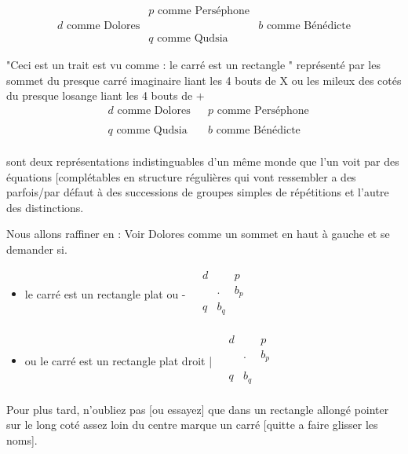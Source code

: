 \documentclass{article}
\begin{document}
$$\begin{matrix}
& p \text{ comme Perséphone}&\\
d \text{ comme Dolores}&&b\text{ comme Bénédicte}\\
&q\text{ comme Qudsia}&
\end{matrix}$$

  "Ceci est un trait est vu comme : le carré est un rectangle " représenté par les sommet du presque carré imaginaire liant les 4 bouts de X ou les mileux des cotés du presque losange liant les 4 bouts de  +
 $$\begin{matrix}
& d\text{ comme Dolores}&&p\text{ comme Perséphone}\\
&&\\
&q\text{ comme Qudsia}&&b\text{ comme Bénédicte}\\
\end{matrix}$$ 


sont deux représentations indistinguables d'un même monde que l'un voit par des équations [complétables en structure régulières qui vont ressembler a des parfois/par défaut  à des successions de groupes simples de répétitions 
et l'autre des distinctions.


Nous allons raffiner  en :
Voir Dolores comme un sommet en haut à gauche et se demander si. 

\begin{itemize}
\item  le carré est un rectangle plat ou -
 $\begin{matrix}
& d&&p\\
&&.&b_p\\
&q&b_q\\
\end{matrix}$ 
\item ou  le carré est un rectangle plat droit |
 $\begin{matrix}
& d&&p\\
&&.&b_p\\
&&\\
&q&b_q&\\
\end{matrix}$
\end{itemize}

Pour plus tard, n'oubliez pas [ou essayez] que dans un rectangle allongé  pointer  sur le long coté assez loin du centre marque un carré [quitte a faire glisser les noms].  
\end{document}
